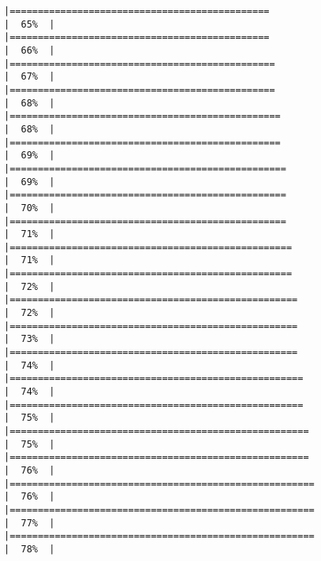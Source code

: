 \documentclass[
]{article}
\begin{document}
\begin{verbatim}
|==============================================                        |  65%  |                                                                              |==============================================                        |  66%  |                                                                              |===============================================                       |  67%  |                                                                              |===============================================                       |  68%  |                                                                              |================================================                      |  68%  |                                                                              |================================================                      |  69%  |                                                                              |=================================================                     |  69%  |                                                                              |=================================================                     |  70%  |                                                                              |=================================================                     |  71%  |                                                                              |==================================================                    |  71%  |                                                                              |==================================================                    |  72%  |                                                                              |===================================================                   |  72%  |                                                                              |===================================================                   |  73%  |                                                                              |===================================================                   |  74%  |                                                                              |====================================================                  |  74%  |                                                                              |====================================================                  |  75%  |                                                                              |=====================================================                 |  75%  |                                                                              |=====================================================                 |  76%  |                                                                              |======================================================                |  76%  |                                                                              |======================================================                |  77%  |                                                                              |======================================================                |  78%  |                                                                              
\end{verbatim}
\end{document}
